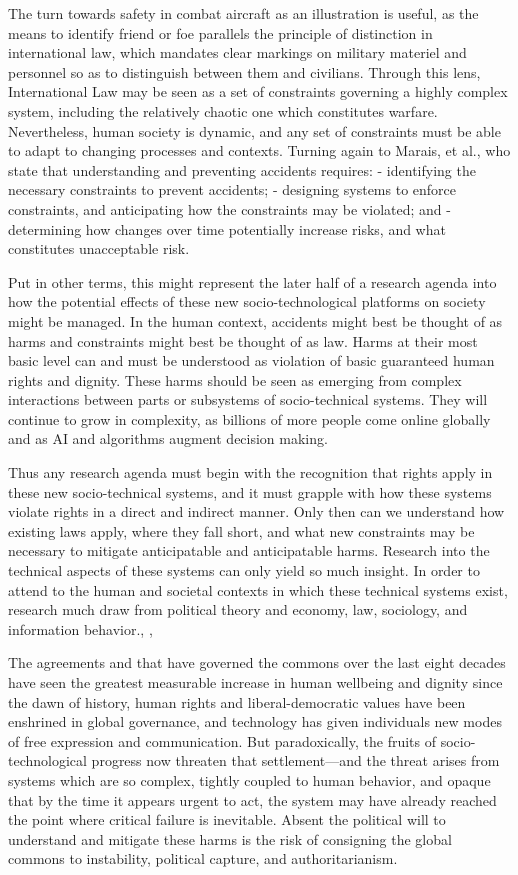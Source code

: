 \documentclass[10pt,twocolumn]{article}   	%
\begin{document}
The turn towards safety in combat aircraft as an illustration is useful,
as the means to identify friend or foe parallels the principle of
distinction in international law, which mandates clear markings on
military materiel and personnel so as to distinguish between them and
civilians. Through this lens, International Law may
be seen as a set of constraints governing a highly complex system,
including the relatively chaotic one which constitutes warfare.
Nevertheless, human society is dynamic, and any set of constraints must
be able to adapt to changing processes and contexts. Turning again to
Marais, et al., who state that understanding and preventing accidents
requires: - identifying the necessary constraints to prevent accidents;
- designing systems to enforce constraints, and anticipating how the
constraints may be violated; and - determining how changes over time
potentially increase risks, and what constitutes unacceptable
risk.\cite[p. 13]{Marais}

Put in other terms, this might represent the later half of a research
agenda into how the potential effects of these new socio-technological
platforms on society might be managed. In the human context, accidents
might best be thought of as harms and constraints might best be thought
of as law. Harms at their most basic level can and must be understood as
violation of basic guaranteed human rights and dignity. These harms
should be seen as emerging from complex interactions between parts or
subsystems of socio-technical systems. They will continue to grow in
complexity, as billions of more people come online globally and as AI
and algorithms augment decision making.

Thus any research agenda must begin with the recognition that rights
apply in these new socio-technical systems, and it must grapple with how
these systems violate rights in a direct and indirect manner. Only then
can we understand how existing laws apply, where they fall short, and
what new constraints may be necessary to mitigate anticipatable and
anticipatable harms. Research into the technical aspects of these
systems can only yield so much insight. In order to attend to the human
and societal contexts in which these technical systems exist, research
much draw from political theory and economy, law, sociology, and
information behavior.\cite[p.12]{Marais}, \cite[p. 77]{Crawford2016}, \cite[p. 135]{Winner1980}

The agreements and that have governed the commons over the last eight
decades have seen the greatest measurable increase in human wellbeing
and dignity since the dawn of history, human rights and
liberal-democratic values have been enshrined in global governance, and
technology has given individuals new modes of free expression and
communication. But paradoxically, the fruits of socio-technological
progress now threaten that settlement---and the threat arises from
systems which are so complex, tightly coupled to human behavior, and
opaque that by the time it appears urgent to act, the system may have
already reached the point where critical failure is inevitable. Absent
the political will to understand and mitigate these harms is the risk of
consigning the global commons to instability, political capture, and
authoritarianism.



\end{document}
